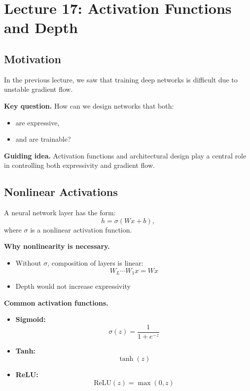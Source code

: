 \section{Lecture 17: Activation Functions and Depth}

\subsection{Motivation}

In the previous lecture, we saw that training deep networks is difficult due to unstable gradient flow.

\medskip

\noindent
\textbf{Key question.}  
How can we design networks that both:
\begin{itemize}
    \item are expressive,
    \item and are trainable?
\end{itemize}

\medskip

\noindent
\textbf{Guiding idea.}  
Activation functions and architectural design play a central role in controlling both expressivity and gradient flow.

\subsection{Nonlinear Activations}

A neural network layer has the form:
\[
h = \sigma(Wx + b),
\]
where $\sigma$ is a nonlinear activation function.

\medskip

\noindent
\textbf{Why nonlinearity is necessary.}

\begin{itemize}
    \item Without $\sigma$, composition of layers is linear:
    \[
    W_L \cdots W_1 x = W x
    \]
    \item Depth would not increase expressivity
\end{itemize}

\medskip

\noindent
\textbf{Common activation functions.}

\begin{itemize}
    \item \textbf{Sigmoid:}
    \[
    \sigma(z) = \frac{1}{1 + e^{-z}}
    \]

    \item \textbf{Tanh:}
    \[
    \tanh(z)
    \]

    \item \textbf{ReLU:}
    \[
    \text{ReLU}(z) = \max(0, z)
    \]
\end{itemize}

